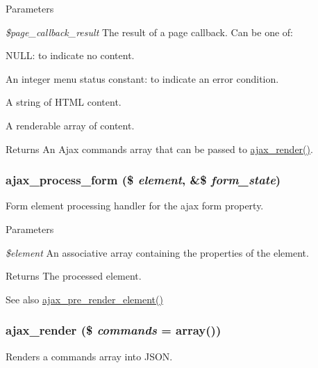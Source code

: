 \begin{DoxyParams}{Parameters}
\item[{\em \$page\_\-callback\_\-result}]The result of a page callback. Can be one of:
\begin{DoxyItemize}
\item NULL: to indicate no content.
\item An integer menu status constant: to indicate an error condition.
\item A string of HTML content.
\item A renderable array of content.
\end{DoxyItemize}\end{DoxyParams}
\begin{DoxyReturn}{Returns}
An Ajax commands array that can be passed to \hyperlink{group__ajax_ga241c2426bdde049c55b05b7bf5d714a2}{ajax\_\-render()}. 
\end{DoxyReturn}
\hypertarget{group__ajax_ga41a006b5f6d97e6e56e542f68fbc340d}{
\subsubsection[{ajax\_\-process\_\-form}]{\setlength{\rightskip}{0pt plus 5cm}ajax\_\-process\_\-form (\$ {\em element}, \/  \&\$ {\em form\_\-state})}}
\label{group__ajax_ga41a006b5f6d97e6e56e542f68fbc340d}
Form element processing handler for the ajax form property.


\begin{DoxyParams}{Parameters}
\item[{\em \$element}]An associative array containing the properties of the element.\end{DoxyParams}
\begin{DoxyReturn}{Returns}
The processed element.
\end{DoxyReturn}
\begin{DoxySeeAlso}{See also}
\hyperlink{group__ajax_ga028d2f2b6b3875d91ea6cc88b19f237b}{ajax\_\-pre\_\-render\_\-element()} 
\end{DoxySeeAlso}
\hypertarget{group__ajax_ga241c2426bdde049c55b05b7bf5d714a2}{
\subsubsection[{ajax\_\-render}]{\setlength{\rightskip}{0pt plus 5cm}ajax\_\-render (\$ {\em commands} = {\ttfamily array()})}}
\label{group__ajax_ga241c2426bdde049c55b05b7bf5d714a2}
Renders a commands array into JSON.


